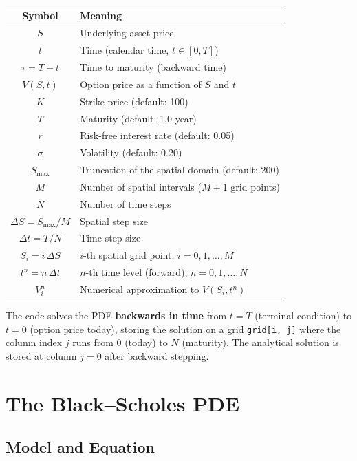 \documentclass[12pt, a4paper]{article}
\begin{document}
\begin{center}
\begin{tabular}{cl}
\toprule
\textbf{Symbol} & \textbf{Meaning} \\
\midrule
$S$ & Underlying asset price \\
$t$ & Time (calendar time, $t \in [0, T]$) \\
$\tau = T - t$ & Time to maturity (backward time) \\
$V(S, t)$ & Option price as a function of $S$ and $t$ \\
$K$ & Strike price (default: 100) \\
$T$ & Maturity (default: 1.0 year) \\
$r$ & Risk-free interest rate (default: 0.05) \\
$\sigma$ & Volatility (default: 0.20) \\
$S_{\max}$ & Truncation of the spatial domain (default: 200) \\
$M$ & Number of spatial intervals ($M+1$ grid points) \\
$N$ & Number of time steps \\
$\Delta S = S_{\max}/M$ & Spatial step size \\
$\Delta t = T/N$ & Time step size \\
$S_i = i\,\Delta S$ & $i$-th spatial grid point, $i = 0, 1, \ldots, M$ \\
$t^n = n\,\Delta t$ & $n$-th time level (forward), $n = 0, 1, \ldots, N$ \\
$V_i^n$ & Numerical approximation to $V(S_i, t^n)$ \\
\bottomrule
\end{tabular}
\end{center}

\medskip
\noindent
The code solves the PDE \textbf{backwards in time} from $t = T$ (terminal
condition) to $t = 0$ (option price today), storing the solution on a grid
\texttt{grid[i, j]} where the column index $j$ runs from $0$ (today) to
$N$ (maturity). The analytical solution is stored at column $j = 0$ after
backward stepping.

\section{The Black--Scholes PDE}

\subsection{Model and Equation}
\end{document}
